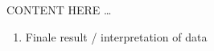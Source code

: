 CONTENT HERE \dots

\begin{enumerate}
    \item Finale result / interpretation of data
\end{enumerate}